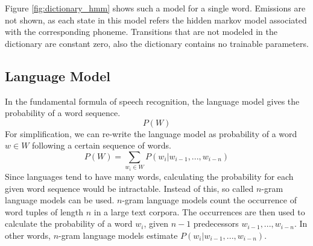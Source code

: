 \begin{minipage}{\linewidth}
	\label{fig:dictionary_hmm}
	\hspace{1cm}
\end{minipage}
Figure \ref{fig:dictionary_hmm} shows such a model for a single word. Emissions are not shown, as each state in this model refers the hidden markov model associated with the corresponding phoneme. Transitions that are not modeled in the dictionary are constant zero, also the dictionary contains no trainable parameters.
 
\subsection{Language Model}
\label{sec:language_model}
In the fundamental formula of speech recognition, the language model gives the probability of a word sequence. 
\[
P(W)
\]
For simplification, we can re-write the language model as probability of a word $w \in W$ following a certain sequence of words.
\[
P(W) = \sum_{w_i \in W} P(w_i|w_{i - 1},...,w_{i - n})
\]
Since languages tend to have many words, calculating the probability for each given word sequence would be intractable. Instead of this, so called $n$-gram language models can be used. $n$-gram language models count the occurrence of word tuples of length $n$ in a large text corpora. The occurrences are then used to calculate the probability of a word $w_i$, given $n - 1$ predecessors $w_{i - 1}, ..., w_{i - n}$. In other words, $n$-gram language models estimate $P(w_i|w_{i - 1},...,w_{i - n})$. 

